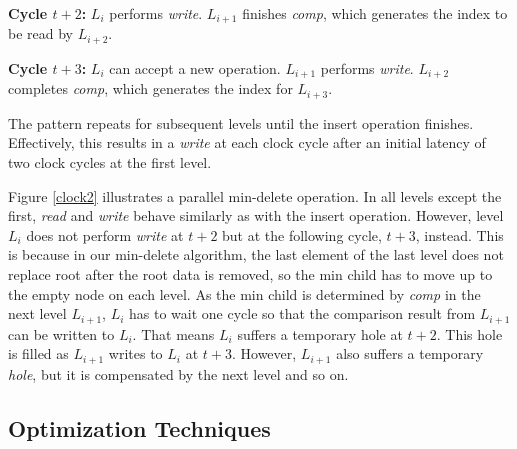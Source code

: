 {\bf Cycle $t+2$:} $L_i$ performs {\it write}. $L_{i+1}$ finishes {\it comp}, which generates the index to be read by $L_{i+2}$.

{\bf Cycle $t+3$:} $L_i$ can accept a new operation. $L_{i+1}$ performs {\it write}. $L_{i+2}$ completes {\it comp}, which generates the index for $L_{i+3}$.

The pattern repeats for subsequent levels until the insert operation finishes.
Effectively, this results in a {\it write} at each clock cycle after an initial latency of two clock cycles at the first level.


Figure \ref{clock2} illustrates a parallel min-delete operation. 
In all levels except the first, {\it read} and {\it write} behave similarly as with the insert operation.
However, level $L_i$ does not perform {\it write} at $t+2$ but at the following cycle, $t+3$, instead.
This is because in our min-delete algorithm, the last element of the last level does not replace root after the root data is removed, so the min child has to move up to the empty node on each level.
As the min child is determined by {\it comp} in the next level $L_{i+1}$, $L_i$ has to wait one cycle so that the comparison result from $L_{i+1}$ can be written to $L_i$.
That means $L_i$ suffers a temporary hole at $t+2$.
This hole is filled as $L_{i+1}$ writes to $L_i$ at $t+3$.
However, $L_{i+1}$ also suffers a temporary {\it hole}, but it is compensated by the next level and so on.


\subsection{Optimization Techniques}
%

